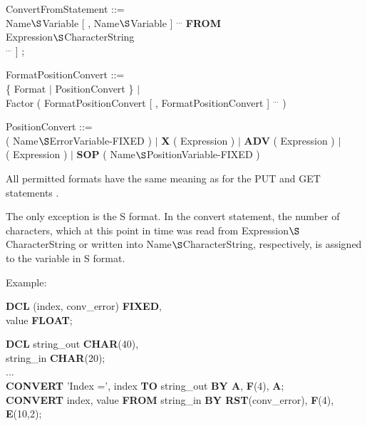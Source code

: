 ConvertFromStatement ::=\\
 Name$\S $Variable [ , Name$\S $Variable ] $^{...}$ {\bf FROM}\\
Expression$\S $CharacterString\\
\x [ {\bf BY} FormatPositionConvert [ , FormatPositionConvert ] $^{...}$ ] ;

FormatPositionConvert ::=\\
\x [ Factor ] \{ Format $\mid$ PositionConvert \} $\mid$\\
\x Factor ( FormatPositionConvert [ , FormatPositionConvert ] $^{...}$ )

PositionConvert ::=\\
 ( Name$\S $ErrorVariable-FIXED ) $\mid$ {\bf X} ( Expression ) $\mid$ {\bf ADV} ( Expression ) $\mid$\\
 ( Expression ) $\mid$ {\bf SOP} ( Name$\S $PositionVariable-FIXED )

All permitted formats have the same meaning as for the PUT and GET
statements .
\begin{removed}
The only exception is the S format. In the convert
statement, the number of characters, which at this point in time was
read from Expression$\S $CharacterString or written into
Name$\S $CharacterString, respectively, is assigned to the variable in S
format.
\end{removed}

Example:

\begin{added}
\begin{tabbing}
{\bf DCL} (index, conv\_error) \= {\bf FIXED},\\
\x        value                \> {\bf FLOAT};\\
\end{tabbing}

{\bf DCL} string\_out {\bf CHAR}(40),\\
\x string\_in {\bf CHAR}(20);\\
...\\
{\bf CONVERT} 'Index =', index {\bf TO} string\_out 
    {\bf BY A}, {\bf F}(4), {\bf A};\\
{\bf CONVERT} index, value {\bf FROM} string\_in {\bf BY RST}(conv\_error), {\bf F}(4), {\bf E}(10,2);
\end{added}


